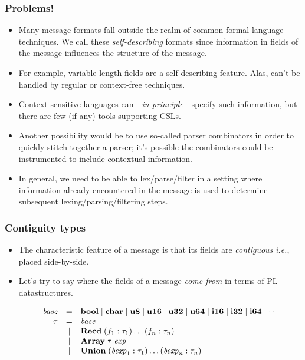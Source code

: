 \documentclass{beamer}
\newcommand{\ie}{\textit{i.e.}}
\newcommand{\konst}[1]{\ensuremath{\mbox{\bf{#1}}}}
\begin{document}
\begin{frame}\frametitle{Problems!}

\begin{itemize}
\item Many message formats fall outside the realm of common formal
  language techniques. We call these \emph{self-describing} formats
  since information in fields of the message influences the structure
  of the message.

\item For example, variable-length fields are a self-describing
  feature. Alas, can't be handled by regular or context-free techniques.

\item Context-sensitive languages can---\emph{in principle}---specify such
  information, but there are few (if any) tools supporting CSLs.

\item Another possibility would be to use so-called parser combinators in
order to quickly stitch together a parser; it's possible the
combinators could be instrumented to include contextual information.

\item In general, we need to be able to lex/parse/filter in a setting
  where information already encountered in the message is used to
  determine subsequent lexing/parsing/filtering steps.

\end{itemize}
\end{frame}

\begin{frame}\frametitle{Contiguity types}

\begin{itemize}

\item The characteristic feature of a message is that its fields are
  \emph{contiguous} \ie, placed side-by-side.

\vspace*{5mm}

\item Let's try to say where the fields of a message \emph{come from}
  in terms of PL datastructures.

\[
\begin{array}{rcl}
 \mathit{base} & = & \konst{bool} \mid \konst{char} \mid \konst{u8} \mid
 \konst{u16} \mid \konst{u32} \mid \konst{u64}  \mid \konst{i16} \mid
 \konst{i32} \mid \konst{i64} \mid \cdots \\
 \tau & = & \mathit{base} \\
      & \mid & \konst{Recd}\; (f_1 : \tau_1) \ldots (f_n : \tau_n) \\
      & \mid & \konst{Array}\; \tau \; \mathit{exp} \\
      & \mid & \konst{Union}\; (\mathit{bexp}_1 : \tau_1) \ldots (\mathit{bexp}_n : \tau_n)
\end{array}
\]

\end{itemize}

\end{frame}
\end{document}
